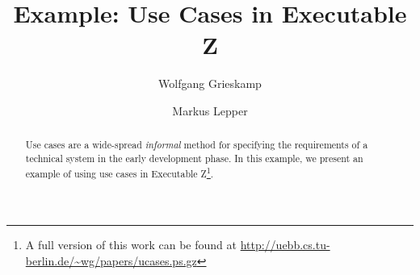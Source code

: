 \documentclass{article}
\begin{document}
\author{Wolfgang Grieskamp \and Markus Lepper}
\title{Example: Use Cases in Executable Z}
\maketitle
\begin{abstract}
  Use cases are a wide-spread \emph{informal} method for specifying
  the requirements of a technical system in the early development
  phase. In this example, we present an example of using
  use cases
  in Executable Z\footnote{A full version of this work
    can be found at 
    \url{http://uebb.cs.tu-berlin.de/~wg/papers/ucases.ps.gz}}.
\end{abstract}






\newcommand{\zblock}[2][2pt]{
  {\arraycolsep#1\begin{array}[t]{lcll}#2\end{array}}}











\end{document}
